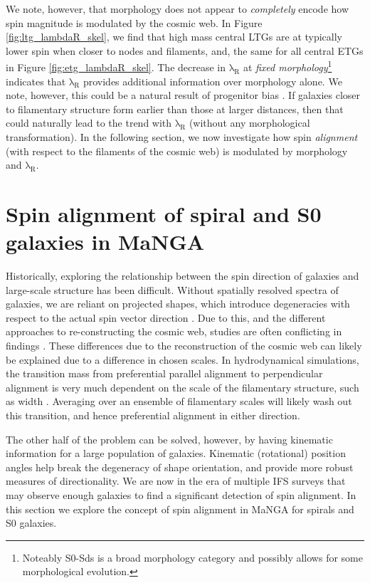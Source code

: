 We note, however, that morphology does not appear to \textit{completely} encode how spin magnitude is modulated by the cosmic web. In Figure \ref{fig:ltg_lambdaR_skel}, we find that high mass central LTGs are at typically lower spin when closer to nodes and filaments, and, the same for all central ETGs in Figure \ref{fig:etg_lambdaR_skel}. The decrease in $\mathrm{\lambda_R}$ at \textit{fixed morphology}\footnote{Noteably S0-Sds is a broad morphology category and possibly allows for some morphological evolution.} indicates that $\mathrm{\lambda_R}$ provides additional information over morphology alone. We note, however, this could be a natural result of progenitor bias \citep[see][for a discussion]{cortese2019}. If galaxies closer to filamentary structure form earlier than those at larger distances, then that could naturally lead to the trend with $\mathrm{\lambda_R}$ (without any morphological transformation). In the following section, we now investigate how spin \textit{alignment} (with respect to the filaments of the cosmic web) is modulated by morphology and $\mathrm{\lambda_R}$. 

\section{Spin alignment of spiral and S0 galaxies in MaNGA} \label{sec:spin_alignment}
Historically, exploring the relationship between the spin direction of galaxies and large-scale structure has been difficult. Without spatially resolved spectra of galaxies, we are reliant on projected shapes, which introduce degeneracies with respect to the actual spin vector direction \citep[e.g. see Fig 2. in][for example of degeneracies that can occur]{motloch2020}. Due to this, and the different approaches to re-constructing the cosmic web, studies are often conflicting in findings \citep[e.g. spiral galaxies having parallel vs perpendicular orientations with respect to the cosmic web][]{tempel2013a, tempel2013b, lee2007, jones2010, zhang2015}. These differences due to the reconstruction of the cosmic web can likely be explained due to a difference in chosen scales. In hydrodynamical simulations, the transition mass from preferential parallel alignment to perpendicular alignment is very much dependent on the scale of the filamentary structure, such as width \citep{ganeshaiahveena2019, Kraljic2019flip}. Averaging over an ensemble of filamentary scales will likely wash out this transition, and hence preferential alignment in either direction. 

The other half of the problem can be solved, however, by having kinematic information for a large population of galaxies. Kinematic (rotational) position angles help break the degeneracy of shape orientation, and provide more robust measures of directionality. We are now in the era of multiple IFS surveys that may observe enough galaxies to find a significant detection of spin alignment. In this section we explore the concept of spin alignment in MaNGA for spirals and S0 galaxies.

